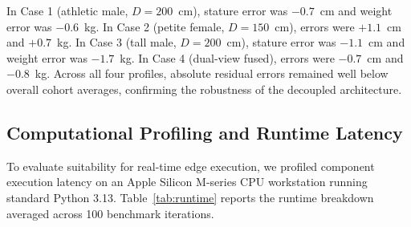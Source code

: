 \documentclass[conference]{IEEEtran}
\begin{document}
\begin{table}[t]
\caption{Representative Participant Case Study Inferences}
\label{tab:casestudies}
\centering
{}
\end{table}

In Case 1 (athletic male, $D=200$~cm), stature error was $-0.7$~cm and weight error was $-0.6$~kg. In Case 2 (petite female, $D=150$~cm), errors were $+1.1$~cm and $+0.7$~kg. In Case 3 (tall male, $D=200$~cm), stature error was $-1.1$~cm and weight error was $-1.7$~kg. In Case 4 (dual-view fused), errors were $-0.7$~cm and $-0.8$~kg. Across all four profiles, absolute residual errors remained well below overall cohort averages, confirming the robustness of the decoupled architecture.

\subsection{Computational Profiling and Runtime Latency}
To evaluate suitability for real-time edge execution, we profiled component execution latency on an Apple Silicon M-series CPU workstation running standard Python 3.13. Table~\ref{tab:runtime} reports the runtime breakdown averaged across 100 benchmark iterations.
\end{document}
